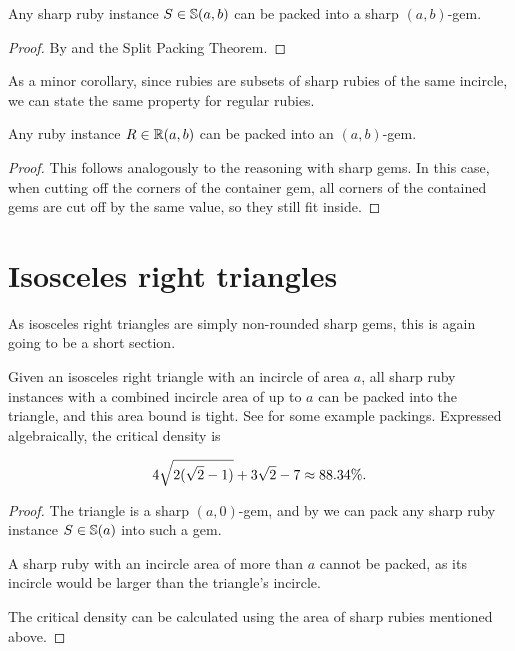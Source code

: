 \documentclass[a4paper,style=print,bibliography=totoc,nexus,lnum,extramargin]{tubsbook}
\begin{document}

\begin{theorem}\label{th:sharp-gem}
    Any sharp ruby instance $S \in \mathbb{S}(a,b)$ can be packed into a sharp $(a,b)$-gem.
\end{theorem}

\begin{proof}
    By  and the Split Packing Theorem.
\end{proof}

As a minor corollary, since rubies are subsets of sharp rubies of the same incircle, we can state the same property for regular rubies.

\begin{theorem}\label{th:gem}
    Any ruby instance $R \in \mathbb{R}(a,b)$ can be packed into an $(a,b)$-gem.
\end{theorem}

\begin{proof}
    This follows analogously to the reasoning with sharp gems. In this case, when cutting off the corners of the container gem, all corners of the contained gems are cut off by the same value, so they still fit inside.
\end{proof}

\section{Isosceles right triangles}

As isosceles right triangles are simply non-rounded sharp gems, this is again going to be a short section.

\begin{theorem}\label{th:iso-right}
    Given an isosceles right triangle with an incircle of area $a$, all sharp ruby instances with a combined incircle area of up to $a$ can be packed into the triangle, and this area bound is tight.
    See  for some example packings.
    Expressed algebraically, the critical density is

    $$4\sqrt{2(\sqrt{2}-1)} + 3\sqrt{2} -7 \approx 88.34\%.$$

\end{theorem}

\begin{proof}
    The triangle is a sharp $(a,0)$-gem, and by  we can pack any sharp ruby instance $S \in \mathbb{S}(a)$ into such a gem.

    A sharp ruby with an incircle area of more than $a$ cannot be packed, as its incircle would be larger than the triangle's incircle.

    The critical density can be calculated using the area of sharp rubies mentioned above.
\end{proof}
\end{document}
